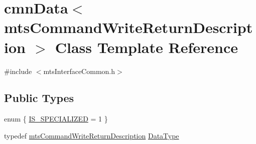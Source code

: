 \hypertarget{classcmn_data_3_01mts_command_write_return_description_01_4}{}\section{cmn\+Data$<$ mts\+Command\+Write\+Return\+Description $>$ Class Template Reference}
\label{classcmn_data_3_01mts_command_write_return_description_01_4}


{\ttfamily \#include $<$mts\+Interface\+Common.\+h$>$}

\subsection*{Public Types}
\begin{DoxyCompactItemize}
\item 
enum \{ \hyperlink{classcmn_data_3_01mts_command_write_return_description_01_4_a4fbf8d6468b7f5a5b1be1e22e1cba1d2a7af3d63cf2681ec419036e6b3139a850}{I\+S\+\_\+\+S\+P\+E\+C\+I\+A\+L\+I\+Z\+E\+D} = 1
 \}
\item 
typedef \hyperlink{classmts_command_write_return_description}{mts\+Command\+Write\+Return\+Description} \hyperlink{classcmn_data_3_01mts_command_write_return_description_01_4_abe59247ead6cb32213ea0a76d9ae56a6}{Data\+Type}
\end{DoxyCompactItemize}

